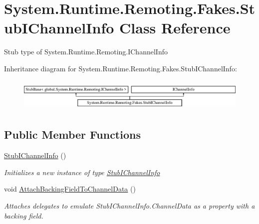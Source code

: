 \hypertarget{class_system_1_1_runtime_1_1_remoting_1_1_fakes_1_1_stub_i_channel_info}{\section{System.\-Runtime.\-Remoting.\-Fakes.\-Stub\-I\-Channel\-Info Class Reference}
\label{class_system_1_1_runtime_1_1_remoting_1_1_fakes_1_1_stub_i_channel_info}
}


Stub type of System.\-Runtime.\-Remoting.\-I\-Channel\-Info 


Inheritance diagram for System.\-Runtime.\-Remoting.\-Fakes.\-Stub\-I\-Channel\-Info\-:\begin{figure}[H]
\begin{center}
\leavevmode
\includegraphics[height=1.586402cm]{class_system_1_1_runtime_1_1_remoting_1_1_fakes_1_1_stub_i_channel_info}
\end{center}
\end{figure}
\subsection*{Public Member Functions}
\begin{DoxyCompactItemize}
\item 
\hyperlink{class_system_1_1_runtime_1_1_remoting_1_1_fakes_1_1_stub_i_channel_info_a8b1ed159409d2c51723cf034a8638733}{Stub\-I\-Channel\-Info} ()
\begin{DoxyCompactList}\small\item\em Initializes a new instance of type \hyperlink{class_system_1_1_runtime_1_1_remoting_1_1_fakes_1_1_stub_i_channel_info}{Stub\-I\-Channel\-Info}\end{DoxyCompactList}\item 
void \hyperlink{class_system_1_1_runtime_1_1_remoting_1_1_fakes_1_1_stub_i_channel_info_a436f0ea73a8431aaa83125970ec78b8f}{Attach\-Backing\-Field\-To\-Channel\-Data} ()
\begin{DoxyCompactList}\small\item\em Attaches delegates to emulate Stub\-I\-Channel\-Info.\-Channel\-Data as a property with a backing field.\end{DoxyCompactList}\end{DoxyCompactItemize}
